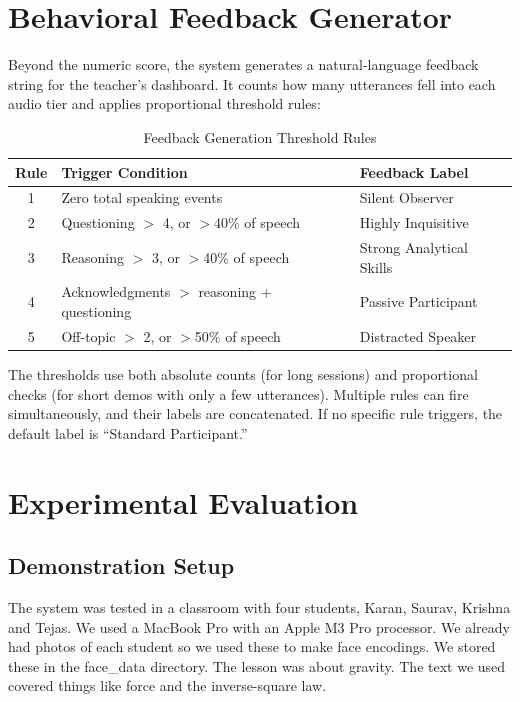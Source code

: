 \documentclass[conference]{IEEEtran}
\begin{document}
\section{Behavioral Feedback Generator}
Beyond the numeric score, the system generates a natural-language feedback string for the teacher's dashboard. It counts how many utterances fell into each audio tier and applies proportional threshold rules:
\begin{table}[htbp]
\caption{Feedback Generation Threshold Rules}
\begin{center}
\begin{tabular}{|c|p{3.6cm}|p{2.8cm}|}
\hline
\textbf{Rule} & \textbf{Trigger Condition} & \textbf{Feedback Label} \\
\hline
1 & Zero total speaking events & Silent Observer \\
\hline
2 & Questioning $>$ 4, or $>$40\% of speech & Highly Inquisitive \\
\hline
3 & Reasoning $>$ 3, or $>$40\% of speech & Strong Analytical Skills \\
\hline
4 & Acknowledgments $>$ reasoning + questioning & Passive Participant \\
\hline
5 & Off-topic $>$ 2, or $>$50\% of speech & Distracted Speaker \\
\hline
\end{tabular}
\label{tab:feedback}
\end{center}
\end{table}
The thresholds use both absolute counts (for long sessions) and proportional checks (for short demos with only a few utterances). Multiple rules can fire simultaneously, and their labels are concatenated. If no specific rule triggers, the default label is ``Standard Participant.''
\section{Experimental Evaluation}
\subsection{Demonstration Setup}
The system was tested in a classroom with four students, Karan, Saurav, Krishna and Tejas. We used a MacBook Pro with an Apple M3 Pro processor. We already had photos of each student so we used these to make face encodings. We stored these in the face\_data directory. The lesson was about gravity. The text we used covered things like force and the inverse-square law.
\end{document}
